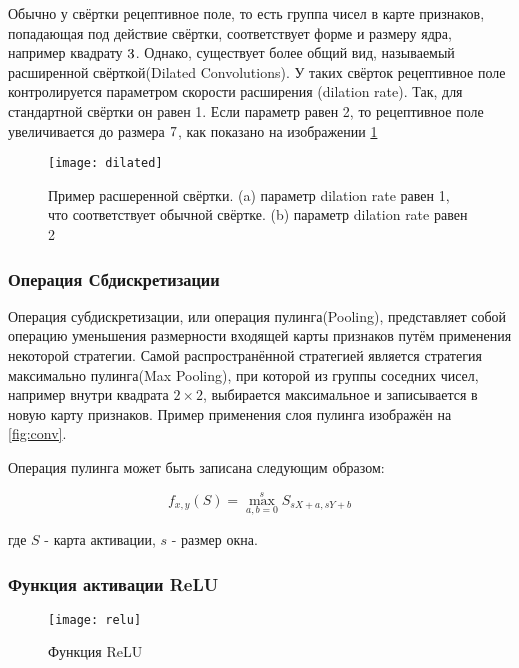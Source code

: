 Обычно у свёртки рецептивное поле, то есть группа чисел в карте признаков, попадающая под действие свёртки,
соответствует форме и размеру ядра, например квадрату $3 \time 3$. Однако, существует более общий вид,
называемый расширенной свёрткой(Dilated Convolutions)\cite{Dilated}. У таких свёрток рецептивное поле контролируется параметром скорости
расширения (dilation rate). Так, для стандартной свёртки он равен 1. Если параметр равен 2, то рецептивное поле увеличивается
до размера $7 \time 7$, как показано на изображении \ref{fig:dilated}

\begin{figure}[h]
    \centering
    \texttt{[image: dilated]}
    \caption{Пример расшеренной свёртки.     (a) параметр dilation rate равен 1, что соответствует обычной свёртке. (b) параметр dilation rate равен 2}
    \label{fig:dilated}
\end{figure}


\subsubsection{Операция Сбдискретизации}

Операция субдискретизации, или операция пулинга(Pooling), представляет собой операцию уменьшения размерности входящей карты признаков 
путём применения некоторой стратегии. Самой распространённой стратегией является стратегия максимально пулинга(Max Pooling),
при которой из группы соседних чисел, например внутри квадрата $2 \times 2$, выбирается максимальное и записывается в новую
карту признаков. Пример применения слоя пулинга изображён на \ref{fig:conv}.


Операция пулинга может быть записана следующим образом:

\begin{equation}
    f_{x,y}(S) = \max_{a,b=0}^{s}S_{sX+a, sY+b}
\end{equation}

где $S$ - карта активации, $s$ - размер окна.

\subsubsection{Функция активации ReLU}

\begin{figure}[h]
    \centering
    \texttt{[image: relu]}
    \caption{Функция ReLU}
    \label{fig:relu}
\end{figure}

